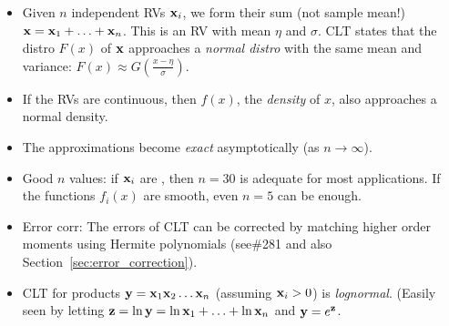 \documentclass[a4paper, oneside]{book}
\begin{document}
\begin{itemize}
	\begin{itemize}
	\item Given $n$ independent RVs $\mathbf{x}_i$, we form their sum (not sample mean!) $\mathbf{x}=\mathbf{x}_1+ \hdots+ \mathbf{x}_n$. This is an RV with mean $\eta$ and $\sigma$. CLT states that the distro $F(x)$ of $\mathbf{x}$ approaches a \textit{normal distro} with the same mean and variance: $F(x)\approx G(\frac{x-\eta}{\sigma})$.
	\item If the RVs are continuous, then $f(x)$, the \textit{density} of $x$, also approaches a normal density.
	\item The approximations become \textit{exact} asymptotically (\ie as $n\to \infty$).  
	\item Good $n$ values: if $\mathbf{x}_i$ are \iid, then $n=30$ is adequate for most applications. If the functions $f_{i}(x)$ are smooth, even $n=5$ can be enough.
	\item Error corr: The errors of CLT can be corrected by matching higher order moments using Hermite polynomials (see\#281 and also Section~\ref{sec:error_correction}).
	\item CLT for products $\mathbf{y}=\mathbf{x}_1\mathbf{x}_2\hdots\mathbf{x}_n$ (assuming $\mathbf{x}_i>0$) is \textit{lognormal}. (Easily seen by letting $\mathbf{z} = \ln{\mathbf{y}} = \ln \mathbf{x}_1+\hdots+\ln\mathbf{x}_n$ and $\mathbf{y} = e^{\mathbf{z}}$.
	\end{itemize}
	
\end{itemize}
\end{document}
